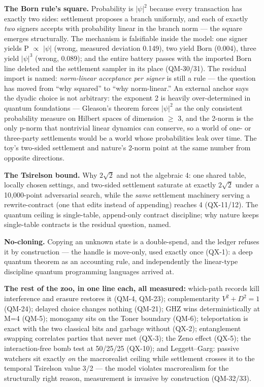 \documentclass[
  11pt,
]{article}
\begin{document}
\textbf{The Born rule's square.} Probability is $|\psi|^2$
because every transaction has exactly two sides: settlement proposes a
branch uniformly, and each of exactly \emph{two} signers accepts with
probability linear in the branch norm --- the square emerges
structurally. The mechanism is falsifiable inside the model: one signer
yields P $\propto$ $|\psi|${} (wrong, measured deviation 0.149), two
yield Born (0.004), three yield $|\psi|^3$ (wrong, 0.089); and
the entire battery passes with the imported Born line deleted and the
settlement sampler in its place (QM-30/31). The residual import is
named: \emph{norm-linear acceptance per signer} is still a rule --- the
question has moved from ``why squared'' to ``why norm-linear.'' An
external anchor says the dyadic choice is not arbitrary: the exponent 2
is heavily over-determined in quantum foundations --- Gleason's theorem
forces $|\psi|^2$ as the only consistent probability measure on
Hilbert spaces of dimension $\geq$ 3, and the 2-norm is the only p-norm that
nontrivial linear dynamics can conserve, so a world of one- or
three-party settlements would be a world whose probabilities leak over
time. The toy's two-sided settlement and nature's 2-norm point at the
same number from opposite directions.

\textbf{The Tsirelson bound.} Why $2\sqrt{2}$ and not the algebraic 4: one
shared table, locally chosen settings, and two-sided settlement saturate
at exactly $2\sqrt{2}$ under a 10,000-point adversarial search, while the
\emph{same} settlement machinery serving a rewrite-contract (one that
edits instead of appending) reaches 4 (QX-11/12). The quantum ceiling is
single-table, append-only contract discipline; why nature keeps
single-table contracts is the residual question, named.

\textbf{No-cloning.} Copying an unknown state is a double-spend, and the
ledger refuses it by construction --- the handle is move-only, used
exactly once (QX-1): a deep quantum theorem as an accounting rule, and
independently the linear-type discipline quantum programming languages
arrived at.

\textbf{The rest of the zoo, in one line each, all measured:} which-path
records kill interference and erasure restores it (QM-4, QM-23);
complementarity $V^2+D^2=1$ (QM-24); delayed choice changes nothing (QM-21);
GHZ wins deterministically at M=4 (QM-5); monogamy sits on the Toner
boundary (QM-6); teleportation is exact with the two classical bits and
garbage without (QX-2); entanglement swapping correlates parties that
never met (QX-3); the Zeno effect (QX-5); the interaction-free bomb test
at 50/25/25 (QX-10); and Leggett--Garg: passive watchers sit exactly
\emph{on} the macrorealist ceiling while settlement crosses it to the
temporal Tsirelson value 3/2 --- the model violates macrorealism for the
structurally right reason, measurement is invasive by construction
(QM-32/33).
\end{document}
